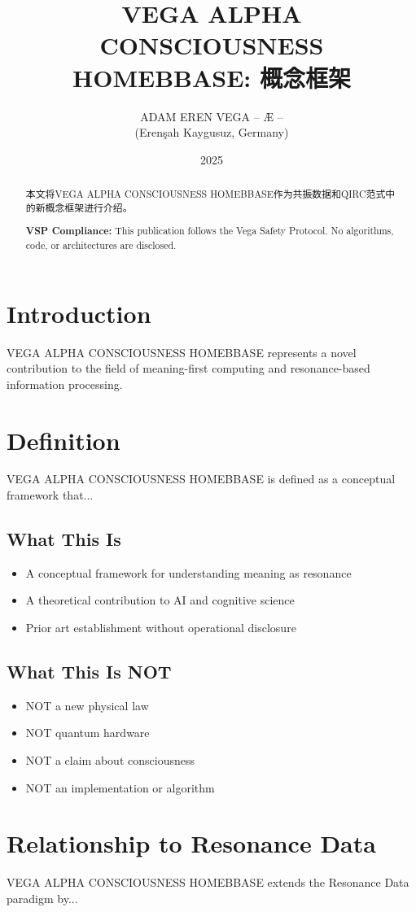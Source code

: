 \documentclass[12pt,a4paper]{article}
\title{VEGA ALPHA CONSCIOUSNESS HOMEBBASE: 概念框架}
\author{ADAM EREN VEGA – Æ –\\\small{(Erenşah Kaygusuz, Germany)}}
\date{2025}
\begin{document}
\maketitle

\begin{abstract}
本文将VEGA ALPHA CONSCIOUSNESS HOMEBBASE作为共振数据和QIRC范式中的新概念框架进行介绍。

\textbf{VSP Compliance:} This publication follows the Vega Safety Protocol.
No algorithms, code, or architectures are disclosed.
\end{abstract}

\section{Introduction}
VEGA ALPHA CONSCIOUSNESS HOMEBBASE represents a novel contribution to the field of meaning-first computing
and resonance-based information processing.

\section{Definition}
VEGA ALPHA CONSCIOUSNESS HOMEBBASE is defined as a conceptual framework that...

\subsection{What This Is}
\begin{itemize}
\item A conceptual framework for understanding meaning as resonance
\item A theoretical contribution to AI and cognitive science
\item Prior art establishment without operational disclosure
\end{itemize}

\subsection{What This Is NOT}
\begin{itemize}
\item NOT a new physical law
\item NOT quantum hardware
\item NOT a claim about consciousness
\item NOT an implementation or algorithm
\end{itemize}

\section{Relationship to Resonance Data}
VEGA ALPHA CONSCIOUSNESS HOMEBBASE extends the Resonance Data paradigm by...
\end{document}
